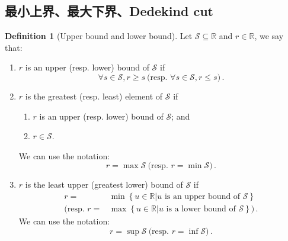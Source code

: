 \documentclass{book}
\theoremstyle{definition}
\newtheorem{definition}{Definition}[section]
\begin{document}
\subsection{最小上界、最大下界、Dedekind cut}
\label{subsec:minmaxbound}
\begin{definition}[Upper bound and lower bound]
Let $\mathcal{S} \subseteq \mathbb{R}$ and $r \in \mathbb{R}$, we say that:
\begin{enumerate}
    \item $r$ is an upper (resp. lower) bound of $\mathcal{S}$ if 
    \begin{equation}
        \forall s \in \mathcal{S}, r \ge s 
        ~\text{(resp. } \forall s \in \mathcal{S}, r \le s \text{)} \,.
    \end{equation}
   
    \item $r$ is the greatest (resp. least) element of $\mathcal{S}$ if 
    \begin{enumerate}
        \item $r$ is an upper (resp. lower) bound of $\mathcal{S}$; and 
        \item $r\in\mathcal{S}$.
    \end{enumerate}
    We can use the notation: 
    \begin{equation}
        r=\max \mathcal{S}
        ~\text{(resp. } r=\min \mathcal{S} \text{)}  \,.
    \end{equation}

    \item $r$ is the least upper (greatest lower) bound of $\mathcal{S}$ if 
    \begin{equation}
    \begin{aligned}
        r=&\min \left\{ u\in\mathbb{R} | u \text{ is an upper bound of } \mathcal{S} \right\} \\
        \text{(resp. } r=&\max \left\{ u\in\mathbb{R} | u \text{ is a lower bound of } \mathcal{S}  \right\} \text{)} \,.
    \end{aligned}
    \end{equation}
    We can use the notation: 
    \begin{equation}
        r=\sup \mathcal{S}
        ~\text{(resp. } r=\inf \mathcal{S} \text{)}  \,.
    \end{equation}
\end{enumerate}
\end{definition}
\end{document}
